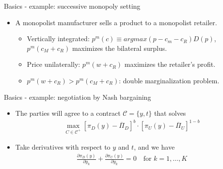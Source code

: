 \documentclass[aspectratio=169]{beamer}  %
\begin{document}
\begin{frame}{Basics - example: successive monopoly setting}
    \begin{itemize}
        \item A monopolist manufacturer sells a product to a monopolist retailer. \vspace{.2cm}
        \begin{itemize}
            \item Vertically integrated: $p^m(c)\equiv argmax (p-c_m-c_R)D(p)$, $p^m(c_M+c_R)$ maximizes the bilateral surplus. \vspace{.2cm}
            \item Price unilaterally: $p^m(w+c_R)$ maximizes the retailer's profit. \vspace{.2cm}
            \item $p^m(w+c_R) > p^m(c_M+c_R)$: double marginalization problem. \vspace{.2cm} 
        \end{itemize} 
    \end{itemize}
\end{frame}

\begin{frame}{Basics - example: negotiation by Nash bargaining}
    \begin{itemize}
        \item The parties will agree to a contract $\mathcal{C} = \{y, t\}$ that solves 
        \begin{align}
            \max_{C \in \mathcal{C}^+} \left[ \pi_D(y) - \overline{\Pi}_D \right]^b \cdot \left[ \pi_U(y) - \overline{\Pi}_U \right]^{1-b}
        \end{align}
        \item Take derivatives with respect to $y$ and $t$, and we have
        \begin{align}
            \frac{\partial \pi_D(y)}{\partial y_k} + \frac{\partial \pi_U(y)}{\partial y_k} = 0 \quad \text{for } k = 1, \ldots, K
        \end{align}
            
    \end{itemize}
\end{frame}
\end{document}
